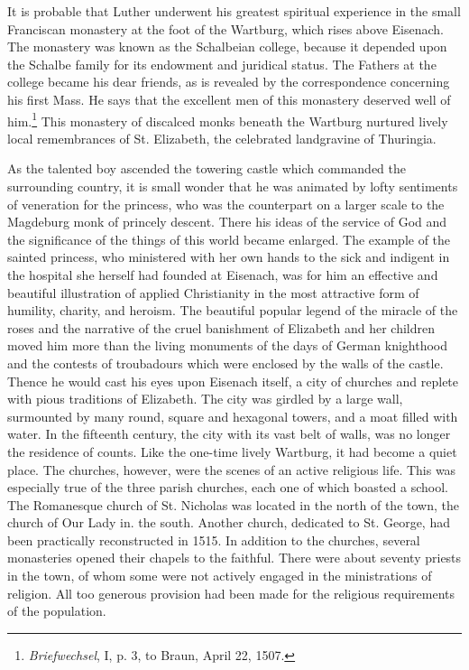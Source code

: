 It is probable that Luther underwent his greatest spiritual experience in the small Franciscan monastery at the foot of the Wartburg,
which rises above Eisenach. The monastery was known as the Schalbeian college, because it depended upon the Schalbe family for its endowment and juridical status. The Fathers at the college became his
dear friends, as is revealed by the correspondence concerning his first
Mass. He says that the excellent men of this monastery deserved well
of him.\footnote{\textit{Briefwechsel}, I, p. 3, to Braun, April 22, 1507.}
This monastery of discalced monks beneath the Wartburg
nurtured lively local remembrances of St. Elizabeth, the celebrated
landgravine of Thuringia.

As the talented boy ascended the towering castle which commanded
the surrounding country, it is small wonder that he was animated by
lofty sentiments of veneration for the princess, who was the counterpart on a larger scale to the Magdeburg monk of princely descent.
There his ideas of the service of God and the significance of the things
of this world became enlarged. The example of the sainted princess,
who ministered with her own hands to the sick and indigent in the
hospital she herself had founded at Eisenach, was for him an effective
and beautiful illustration of applied Christianity in the most attractive form of humility, charity, and heroism. The beautiful popular
legend of the miracle of the roses and the narrative of the cruel banishment of Elizabeth and her children moved him more than the living
monuments of the days of German knighthood and the contests of
troubadours which were enclosed by the walls of the castle. Thence
he would cast his eyes upon Eisenach itself, a city of churches and replete with pious traditions of Elizabeth. The city was girdled by a
large wall, surmounted by many round, square and hexagonal towers,
and a moat filled with water. In the fifteenth century, the city with
its vast belt of walls, was no longer the residence of counts. Like the
one-time lively Wartburg, it had become a quiet place. The churches,
however, were the scenes of an active religious life. This was especially
true of the three parish churches, each one of which boasted a school.
The Romanesque church of St. Nicholas was located in the north of
the town, the church of Our Lady in. the south. Another church,
dedicated to St. George, had been practically reconstructed in 1515.
In addition to the churches, several monasteries opened their chapels
to the faithful. There were about seventy priests in the town, of whom
some were not actively engaged in the ministrations of religion. All
too generous provision had been made for the religious requirements
of the population.

